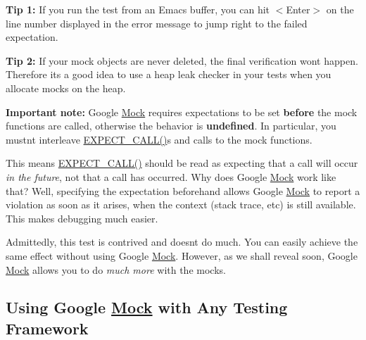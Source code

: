 {\bfseries{Tip 1\+:}} If you run the test from an Emacs buffer, you can hit {\ttfamily $<$Enter$>$} on the line number displayed in the error message to jump right to the failed expectation.

{\bfseries{Tip 2\+:}} If your mock objects are never deleted, the final verification won\textquotesingle{}t happen. Therefore it\textquotesingle{}s a good idea to use a heap leak checker in your tests when you allocate mocks on the heap.

{\bfseries{Important note\+:}} Google \mbox{\hyperlink{class_mock}{Mock}} requires expectations to be set {\bfseries{before}} the mock functions are called, otherwise the behavior is {\bfseries{undefined}}. In particular, you mustn\textquotesingle{}t interleave {\ttfamily \mbox{\hyperlink{googletest-master_2googlemock_2include_2gmock_2gmock-spec-builders_8h_a535a6156de72c1a2e25a127e38ee5232}{E\+X\+P\+E\+C\+T\+\_\+\+C\+A\+L\+L()}}}s and calls to the mock functions.

This means {\ttfamily \mbox{\hyperlink{googletest-master_2googlemock_2include_2gmock_2gmock-spec-builders_8h_a535a6156de72c1a2e25a127e38ee5232}{E\+X\+P\+E\+C\+T\+\_\+\+C\+A\+L\+L()}}} should be read as expecting that a call will occur {\itshape in the future}, not that a call has occurred. Why does Google \mbox{\hyperlink{class_mock}{Mock}} work like that? Well, specifying the expectation beforehand allows Google \mbox{\hyperlink{class_mock}{Mock}} to report a violation as soon as it arises, when the context (stack trace, etc) is still available. This makes debugging much easier.

Admittedly, this test is contrived and doesn\textquotesingle{}t do much. You can easily achieve the same effect without using Google \mbox{\hyperlink{class_mock}{Mock}}. However, as we shall reveal soon, Google \mbox{\hyperlink{class_mock}{Mock}} allows you to do {\itshape much more} with the mocks.

\subsection*{Using Google \mbox{\hyperlink{class_mock}{Mock}} with Any Testing Framework}

